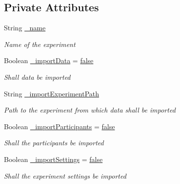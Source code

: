 \subsection*{Private Attributes}
\begin{DoxyCompactItemize}
\item 
String \hyperlink{class_web_analyzer_1_1_events_1_1_create_experiment_event_a9b05cacff687a5907c457a8ae95164b7}{\+\_\+name}
\begin{DoxyCompactList}\small\item\em Name of the experiment \end{DoxyCompactList}\item 
Boolean \hyperlink{class_web_analyzer_1_1_events_1_1_create_experiment_event_ae1fce6913b5681e97a9d07978e1faab2}{\+\_\+import\+Data} = \hyperlink{_u_i_2_h_t_m_l_resources_2js_2src_2export_8js_ae6c865df784842196d411c1466b01686}{false}
\begin{DoxyCompactList}\small\item\em Shall data be imported \end{DoxyCompactList}\item 
String \hyperlink{class_web_analyzer_1_1_events_1_1_create_experiment_event_a8c0fe703fb96fa2fa1f90d2610a8b22a}{\+\_\+import\+Experiment\+Path}
\begin{DoxyCompactList}\small\item\em Path to the experiment from which data shall be imported \end{DoxyCompactList}\item 
Boolean \hyperlink{class_web_analyzer_1_1_events_1_1_create_experiment_event_a59d45ed4f6d0829f185a23dca49f6f12}{\+\_\+import\+Participants} = \hyperlink{_u_i_2_h_t_m_l_resources_2js_2src_2export_8js_ae6c865df784842196d411c1466b01686}{false}
\begin{DoxyCompactList}\small\item\em Shall the participants be imported \end{DoxyCompactList}\item 
Boolean \hyperlink{class_web_analyzer_1_1_events_1_1_create_experiment_event_a0306b88d62bbb8558674ba1c9c2d1b00}{\+\_\+import\+Settings} = \hyperlink{_u_i_2_h_t_m_l_resources_2js_2src_2export_8js_ae6c865df784842196d411c1466b01686}{false}
\begin{DoxyCompactList}\small\item\em Shall the experiment settings be imported \end{DoxyCompactList}\end{DoxyCompactItemize}


